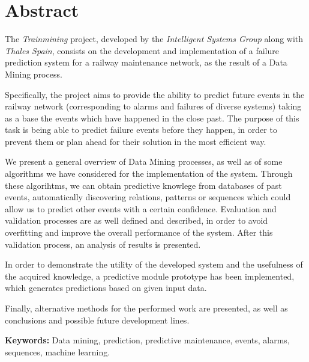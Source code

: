 \chapter*{Abstract}

The \emph{Trainmining} project, developed by the \emph{Intelligent Systems Group} along with \emph{Thales Spain}, consists on the development and implementation of a failure prediction system for a railway maintenance network, as the result of a Data Mining process.

Specifically, the project aims to provide the ability to predict future events in the railway network (corresponding to alarms and failures of diverse systems) taking as a base the events which have happened in the close past. The purpose of this task is being able to predict failure events before they happen, in order to prevent them or plan ahead for their solution in the most efficient way.

We present a general overview of Data Mining processes, as well as of some algorithms we have considered for the implementation of the system. Through these algorihtms, we can obtain predictive knowlege from databases of past events, automatically discovering relations, patterns or sequences which could allow us to predict other events with a certain confidence. Evaluation and validation processes are as well defined and described, in order to avoid overfitting and improve the overall performance of the system. After this validation process, an analysis of results is presented.

In order to demonstrate the utility of the developed system and the usefulness of the acquired knowledge, a predictive module prototype has been implemented, which generates predictions based on given input data.

Finally, alternative methods for the performed work are presented, as well as conclusions and possible future development lines.

\vfill
\textbf{Keywords:} Data mining, prediction, predictive maintenance, events, alarms, sequences, machine learning.
